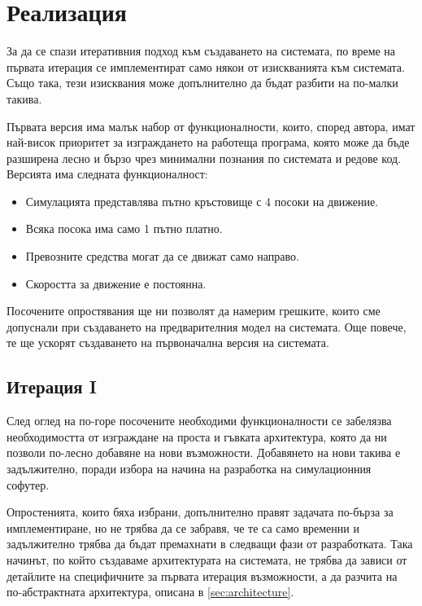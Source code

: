 \section{Реализация}

	За да се спази итеративния подход към създаването на системата,
	по време на първата итерация се имплементират само някои от изискванията към системата. 
	Също така, тези изисквания може допълнително да бъдат разбити на по-малки такива.
	
	Първата версия има малък набор от функционалности, които, според автора, имат най-висок приоритет за
	изграждането на работеща програма, която може да бъде разширена лесно и бързо
	чрез минимални познания по системата и редове код.
	Версията има следната функционалност:
	\begin{itemize}
		\item Симулацията представлява пътно кръстовище с 4 посоки на движение.
		\item Всяка посока има само 1 пътно платно.
		\item Превозните средства могат да се движат само направо.
		\item Скоростта за движение е постоянна.
	\end{itemize}
	
	Посочените опростявания ще ни позволят да намерим грешките, които сме допуснали
	при създаването на предварителния модел на системата. Още повече, 
	те ще ускорят създаването на първоначална версия на системата.
	
	\subsection{Итерация I}
	
		След оглед на по-горе посочените необходими функционалности се забелязва необходимостта от 
		изграждане на проста и гъвката архитектура, която да ни позволи по-лесно добавяне на нови възможности. 
		Добавянето на нови такива е задължително, поради избора на начина на разработка на симулационния софутер. 		
		
		Опростенията, които бяха избрани, допълнително правят задачата по-бърза за имплементиране,
		но не трябва да се забравя, че те са само временни и задължително трябва да бъдат премахнати
		в следващи фази от разработката. Така начинът, по който създаваме архитектурата
		на системата, не трябва да зависи от детайлите на специфичните за първата итерация
		възможности, а да разчита на по-абстрактната архитектура, описана в \ref{sec:architecture}.
		
